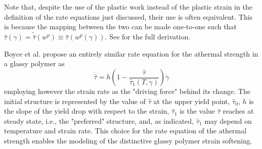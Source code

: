 Note that, despite the use of the plastic work instead of the plastic strain in the definition of the rate equations just discussed, their use is often equivalent.
This is because the mapping between the two can be made one-to-one such that $\hat \tau(\gamma)=\tilde{\hat \tau}(w^p)\equiv \hat\tau(w^p(\gamma))$.
See \cite{desouzanetoComputationalMethodsPlasticity2008} for the full derivation.

Boyce et al. \cite{boyceLargeInelasticDeformation1988} propose an entirely similar rate equation for the athermal strength in a glassy polymer as
\begin{equation}
  \label{eq:rate_equation_bpa}
	\dot{\hat \tau}=h \left(1-\frac{\hat \tau}{\hat \tau_{1} \left(T, \dot{\gamma}\right)}\right)\dot{\gamma}
\end{equation}
employing however the strain rate as the "driving force" behind its change.
The initial structure is represented by the value of $\hat \tau$ at the upper yield point, $\hat \tau_0$, $h$ is the slope of the yield drop with respect to the strain, $\hat \tau_1$ is the value $\hat \tau$ reaches at steady state, i.e., the "preferred" structure, and, as indicated, $\hat \tau_1$ may depend on temperature and strain rate.
This choice for the rate equation of the athermal strength enables the modeling of the distinctive glassy polymer strain softening.

